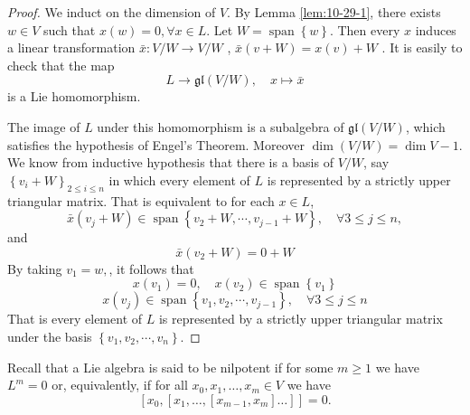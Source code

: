 \documentclass[../main.tex]{subfiles}
\begin{document}
\begin{proof}
  We induct on the dimension of \(  V  \).  By Lemma \ref{lem:10-29-1}, there exists  \(  w \in V  \) such that \( x\left( w \right)= 0, \forall x \in L   \).  Let \(  W= \operatorname{span}\left\{ w \right\}  \). Then every \(  x  \) induces a linear transformation \(  \bar{x}: V/W  \to V/W\) , \(  \bar{x}\left( v+ W  \right)= x\left( v \right)+ W    \)   . It is easily to check that the map \[
    L\to \mathfrak{gl}\left( V / W \right),\quad x\mapsto  \bar{x}
    \] is a Lie homomorphism.

    The image of \(  L  \) under this homomorphism is a subalgebra of \(  \mathfrak{gl}\left( V/W \right)   \), which satisfies the hypothesis of Engel's Theorem. Moreover \(  \operatorname{dim}\left( V /W\right)= \operatorname{dim}V-1    \). We know from inductive hypothesis that there is a basis of \( V/W  \), say \(  \left\{ v_{i}+ W \right\}_{2\le i\le n}  \) in which every element of \(  L  \) is represented by a strictly upper triangular matrix. That is equivalent to for each \(  x\in L  \),  \[
    \bar{x}\left( v_{j} + W\right)\in \operatorname{span}\left\{ v_2+ W ,\cdots ,v_{j-1}+ W\right\}, \quad \forall 3\le j\le n, 
    \]    and \[
    \bar{x}\left( v_2+ W \right)= 0+ W
    \]By taking \(  v_1= w,  \), it follows that \[
    x\left( v_1 \right)= 0,\quad  x\left( v_2 \right)\in \operatorname{span}\left\{ v_1 \right\} 
    \] \[
    x\left( v_{j} \right)\in \operatorname{span}\left\{ v_1,v_2,\cdots ,v_{j-1} \right\} ,\quad \forall 3\le j\le n
    \] That is every element of \(  L  \) is represented by a strictly upper triangular matrix under the basis \(  \left\{ v_1,v_2,\cdots ,v_{n} \right\}  \).  
\end{proof}

\begin{definition}{}{}
    Recall that a Lie algebra is said to be nilpotent if for some $m \geq 1$ we have $L^m = 0$ or, equivalently, if for all $x_0, x_1, \ldots, x_m \in V$ we have
$$[x_0, [x_1, \ldots, [x_{m-1}, x_m] \ldots]] = 0.$$
\end{definition}
\end{document}
